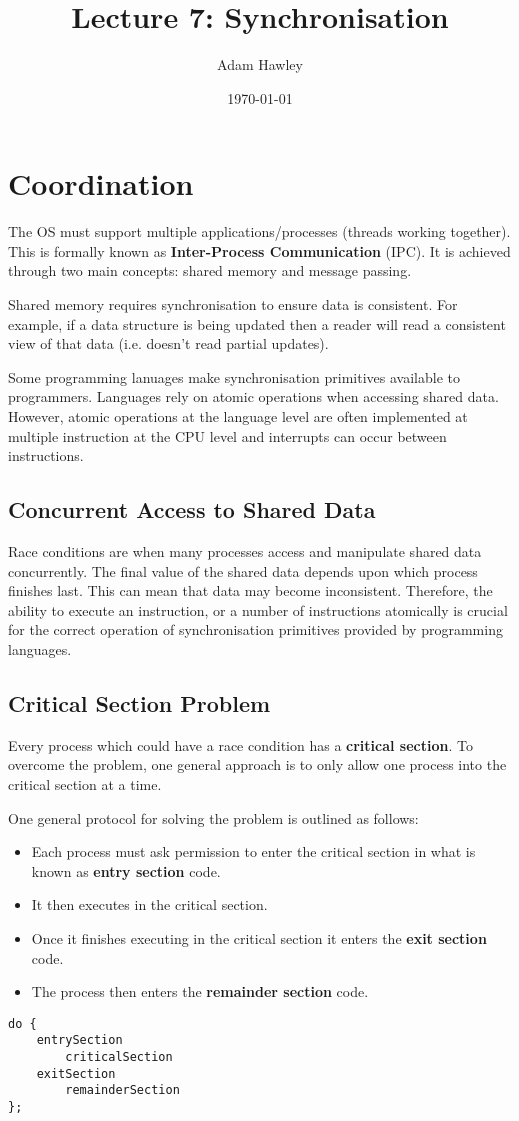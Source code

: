 \documentclass[11pt]{article}
\author{Adam Hawley}
\date{\today}
\title{Lecture 7: Synchronisation}
\begin{document}
\maketitle
\tableofcontents


\section{Coordination}
\label{sec:org991f479}
The OS must support multiple applications/processes (threads working together).
This is formally known as \textbf{Inter-Process Communication} (IPC).
It is achieved through two main concepts: shared memory and message passing.

Shared memory requires synchronisation to ensure data is consistent.
For example, if a data structure is being updated then a reader will read a consistent view of that data (i.e. doesn't read partial updates).

Some programming lanuages make synchronisation primitives available to programmers.
Languages rely on atomic operations when accessing shared data.
However, atomic operations at the language level are often implemented at multiple instruction at the CPU level and interrupts can occur between instructions.

\subsection{Concurrent Access to Shared Data}
\label{sec:org4ec3ec6}
Race conditions are when many processes access and manipulate shared data concurrently.
The final value of the shared data depends upon which process finishes last.
This can mean that data may become inconsistent.
Therefore, the ability to execute an instruction, or a number of instructions atomically is crucial for the correct operation of synchronisation primitives provided by programming languages.

\subsection{Critical Section Problem}
\label{sec:orgcff50db}
Every process which could have a race condition has a \textbf{critical section}.
To overcome the problem, one general approach is to only allow one process into the critical section at a time.

One general protocol for solving the problem is outlined as follows:
\begin{itemize}
\item Each process must ask permission to enter the critical section in what is known as \textbf{entry section} code.
\item It then executes in the critical section.
\item Once it finishes executing in the critical section it enters the \textbf{exit section} code.
\item The process then enters the \textbf{remainder section} code.
\end{itemize}
\begin{verbatim}
do {
    entrySection
        criticalSection
    exitSection
        remainderSection
};
\end{verbatim}
\end{document}
